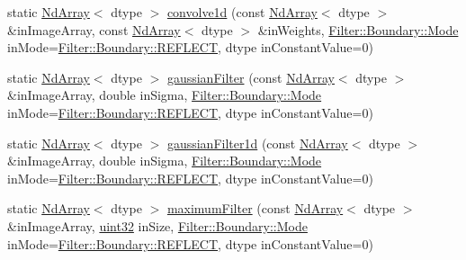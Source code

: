 \begin{DoxyCompactItemize}
\item 
static \mbox{\hyperlink{class_num_cpp_1_1_nd_array}{Nd\+Array}}$<$ dtype $>$ \mbox{\hyperlink{class_num_cpp_1_1_filters_a46a1e5bc5c88996cd3baf20c8f5a37fc}{convolve1d}} (const \mbox{\hyperlink{class_num_cpp_1_1_nd_array}{Nd\+Array}}$<$ dtype $>$ \&in\+Image\+Array, const \mbox{\hyperlink{class_num_cpp_1_1_nd_array}{Nd\+Array}}$<$ dtype $>$ \&in\+Weights, \mbox{\hyperlink{struct_num_cpp_1_1_filter_1_1_boundary_a3fb520b67d524104db12ceef41adf081}{Filter\+::\+Boundary\+::\+Mode}} in\+Mode=\mbox{\hyperlink{struct_num_cpp_1_1_filter_1_1_boundary_a3fb520b67d524104db12ceef41adf081ad0d71a6dafb7ae1e96441e3f9f7aced8}{Filter\+::\+Boundary\+::\+R\+E\+F\+L\+E\+CT}}, dtype in\+Constant\+Value=0)
\item 
static \mbox{\hyperlink{class_num_cpp_1_1_nd_array}{Nd\+Array}}$<$ dtype $>$ \mbox{\hyperlink{class_num_cpp_1_1_filters_aaeee33ddf95d64d4b4d63530a6918465}{gaussian\+Filter}} (const \mbox{\hyperlink{class_num_cpp_1_1_nd_array}{Nd\+Array}}$<$ dtype $>$ \&in\+Image\+Array, double in\+Sigma, \mbox{\hyperlink{struct_num_cpp_1_1_filter_1_1_boundary_a3fb520b67d524104db12ceef41adf081}{Filter\+::\+Boundary\+::\+Mode}} in\+Mode=\mbox{\hyperlink{struct_num_cpp_1_1_filter_1_1_boundary_a3fb520b67d524104db12ceef41adf081ad0d71a6dafb7ae1e96441e3f9f7aced8}{Filter\+::\+Boundary\+::\+R\+E\+F\+L\+E\+CT}}, dtype in\+Constant\+Value=0)
\item 
static \mbox{\hyperlink{class_num_cpp_1_1_nd_array}{Nd\+Array}}$<$ dtype $>$ \mbox{\hyperlink{class_num_cpp_1_1_filters_aa836b33dc4f3fa552b67ef4ad2e1ee8a}{gaussian\+Filter1d}} (const \mbox{\hyperlink{class_num_cpp_1_1_nd_array}{Nd\+Array}}$<$ dtype $>$ \&in\+Image\+Array, double in\+Sigma, \mbox{\hyperlink{struct_num_cpp_1_1_filter_1_1_boundary_a3fb520b67d524104db12ceef41adf081}{Filter\+::\+Boundary\+::\+Mode}} in\+Mode=\mbox{\hyperlink{struct_num_cpp_1_1_filter_1_1_boundary_a3fb520b67d524104db12ceef41adf081ad0d71a6dafb7ae1e96441e3f9f7aced8}{Filter\+::\+Boundary\+::\+R\+E\+F\+L\+E\+CT}}, dtype in\+Constant\+Value=0)
\item 
static \mbox{\hyperlink{class_num_cpp_1_1_nd_array}{Nd\+Array}}$<$ dtype $>$ \mbox{\hyperlink{class_num_cpp_1_1_filters_ab4d6b31618fbf09fafaa0643f4d6dff7}{maximum\+Filter}} (const \mbox{\hyperlink{class_num_cpp_1_1_nd_array}{Nd\+Array}}$<$ dtype $>$ \&in\+Image\+Array, \mbox{\hyperlink{namespace_num_cpp_a36f388e948380413c63011cab9b7fbd5}{uint32}} in\+Size, \mbox{\hyperlink{struct_num_cpp_1_1_filter_1_1_boundary_a3fb520b67d524104db12ceef41adf081}{Filter\+::\+Boundary\+::\+Mode}} in\+Mode=\mbox{\hyperlink{struct_num_cpp_1_1_filter_1_1_boundary_a3fb520b67d524104db12ceef41adf081ad0d71a6dafb7ae1e96441e3f9f7aced8}{Filter\+::\+Boundary\+::\+R\+E\+F\+L\+E\+CT}}, dtype in\+Constant\+Value=0)

\end{DoxyCompactItemize}
